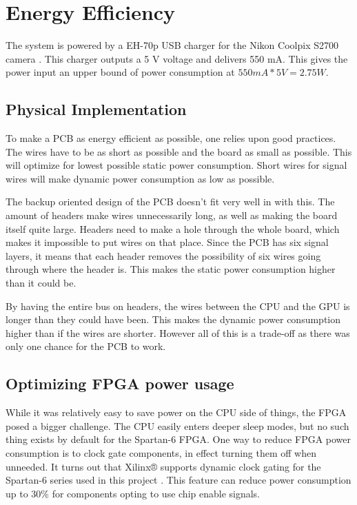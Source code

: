\documentclass[../main/report.tex]{subfiles}
\begin{document}
\section{Energy Efficiency}

The system is powered by a EH-70p USB charger for the Nikon Coolpix S2700 camera \cite[p. 196]{usb-charger}.
This charger outputs a 5 V voltage and delivers 550 mA.
This gives the power input an upper bound of power consumption at $550mA * 5V = 2.75W$.

\subsection{Physical Implementation}

To make a PCB as energy efficient as possible, one relies upon good practices.
The wires have to be as short as possible and the board as small as possible.
This will optimize for lowest possible static power consumption.
Short wires for signal wires will make dynamic power consumption as low as possible.

The backup oriented design of the PCB doesn't fit very well in with this.
The amount of headers make wires unnecessarily long, as well as making the board itself quite large.
Headers need to make a hole through the whole board, which makes it impossible to put wires on that place.
Since the PCB has six signal layers, it means that each header removes the possibility of six wires going through where the header is.
This makes the static power consumption higher than it could be.

By having the entire bus on headers, the wires between the CPU and the GPU is longer than they could have been.
This makes the dynamic power consumption higher than if the wires are shorter.
However all of this is a trade-off as there was only one chance for the PCB to work.


\subsection{Optimizing FPGA power usage}

While it was relatively easy to save power on the CPU side of things, the FPGA posed a bigger challenge.
The CPU easily enters deeper sleep modes, but no such thing exists by default for the Spartan-6 FPGA.
One way to reduce FPGA power consumption is to clock gate components, in effect turning them off when unneeded.
It turns out that Xilinx® supports dynamic clock gating for the Spartan-6 series used in this project \cite{xilinx-clock-gating}.
This feature can reduce power consumption up to 30\% for components opting to use chip enable signals.
\end{document}
